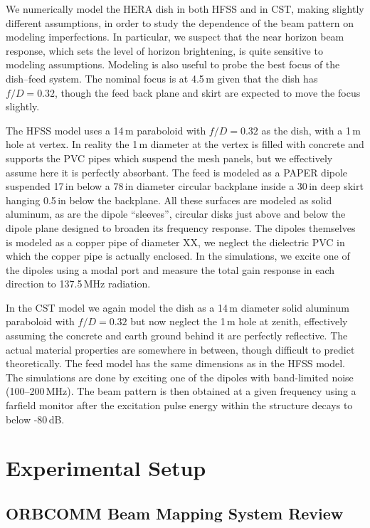 \documentclass{emulateapj}
\begin{document}
We numerically model the HERA dish in both HFSS and in CST, making slightly different assumptions, in order to study the dependence of the beam pattern on modeling imperfections. In particular, we suspect that the near horizon beam response, which sets the level of horizon brightening, is quite sensitive to modeling assumptions. Modeling is also useful to probe the best focus of the dish--feed system. The nominal focus is at 4.5\,m given that the dish has $f/D=0.32$, though the feed back plane and skirt are expected to move the focus slightly.

The HFSS model uses a 14\,m paraboloid with $f/D=0.32$ as the dish, with a 1\,m hole at vertex. In reality the 1\,m diameter at the vertex is filled with concrete and supports the PVC pipes which suspend the mesh panels, but we effectively assume here it is perfectly absorbant.  The feed is modeled as a PAPER dipole suspended 17\,in below a 78\,in diameter circular backplane inside a 30\,in deep skirt hanging 0.5\,in below the backplane. All these surfaces are modeled as solid aluminum, as are the dipole ``sleeves'', circular disks just above and below the dipole plane designed to broaden its frequency response. The dipoles themselves is modeled as a copper pipe of diameter XX, we neglect the dielectric PVC in which the copper pipe is actually enclosed. In the simulations, we excite one of the dipoles using a modal port and measure the total gain response in each direction to 137.5\,MHz radiation.

In the CST model we again model the dish as a 14\,m diameter solid aluminum paraboloid with $f/D=0.32$ but now neglect the 1\,m hole at zenith, effectively assuming the concrete and earth ground behind it are perfectly reflective. The actual material properties are somewhere in between, though difficult to predict theoretically. The feed model has the same dimensions as in the HFSS model. The simulations are done by exciting one of the dipoles with band-limited noise (100--200\,MHz). The beam pattern is then obtained at a given frequency using a farfield monitor after the excitation pulse energy within the structure decays to below -80\,dB.

\section{Experimental Setup}

\subsection{ORBCOMM Beam Mapping System Review}
\end{document}
